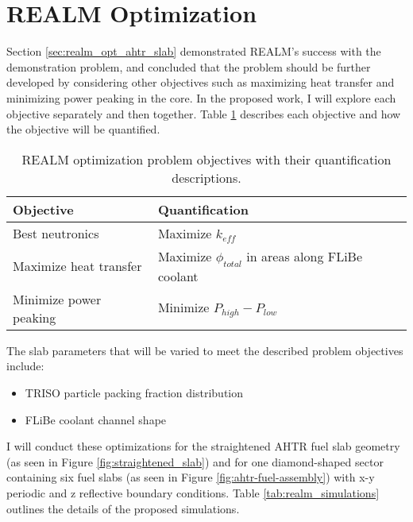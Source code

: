 \section{REALM Optimization}
Section \ref{sec:realm_opt_ahtr_slab} demonstrated \gls{REALM}'s success with the
demonstration problem, and concluded that the problem should be further
developed by considering other objectives such as maximizing heat transfer and 
minimizing power peaking in the core. 
In the proposed work, I will explore each objective separately and then together.
Table \ref{tab:objectives} describes each objective and how the objective will 
be quantified. 
\begin{table}[]
    \centering
    \onehalfspacing
    \caption{\acrfull{REALM} optimization problem objectives with their quantification 
    descriptions.}
	\label{tab:objectives}
    \footnotesize
    \begin{tabular}{p{4cm}p{8cm}}
    \hline 
    \textbf{Objective}& \textbf{Quantification}  \\
    \hline
    Best neutronics & Maximize $k_{eff}$\\ 
    Maximize heat transfer & Maximize $\phi_{total}$ in areas along FLiBe coolant \\
    Minimize power peaking & Minimize $P_{high}-P_{low}$ \\
    \hline
    \end{tabular}
\end{table}
The slab parameters that will be varied to meet the described problem objectives 
include: 
\begin{itemize}
    \item \gls{TRISO} particle packing fraction distribution
    \item \gls{FLiBe} coolant channel shape 
\end{itemize} 
I will conduct these optimizations for the straightened \gls{AHTR} fuel slab 
geometry (as seen in Figure \ref{fig:straightened_slab}) and for one 
diamond-shaped sector containing six fuel slabs (as seen in Figure 
\ref{fig:ahtr-fuel-assembly}) with x-y periodic and z reflective boundary 
conditions. 
Table \ref{tab:realm_simulations} outlines the details of the proposed 
simulations. 
